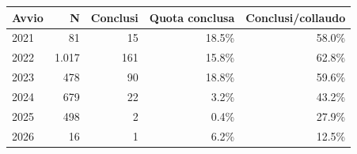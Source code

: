 \begin{tabular}{lrrrr}
\toprule
Avvio & N & Conclusi & Quota conclusa & Conclusi/collaudo \\
\midrule
2021 & 81 & 15 & 18.5\% & 58.0\% \\
2022 & 1.017 & 161 & 15.8\% & 62.8\% \\
2023 & 478 & 90 & 18.8\% & 59.6\% \\
2024 & 679 & 22 & 3.2\% & 43.2\% \\
2025 & 498 & 2 & 0.4\% & 27.9\% \\
2026 & 16 & 1 & 6.2\% & 12.5\% \\
\bottomrule
\end{tabular}

